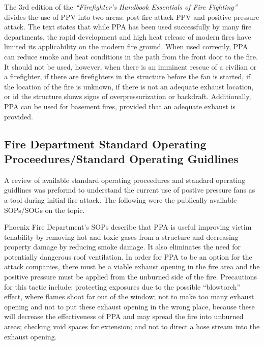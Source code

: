 \documentclass{article}
\begin{document}
The 3rd edition of the \textit{``Firefighter’s Handbook Essentials of Fire Fighting''} divides the use of PPV into two areas: post-fire attack PPV and positive pressure attack. The text states that while PPA has been used successfully by many fire departments, the rapid development and high heat release of modern fires have limited its applicability on the modern fire ground. When used correctly, PPA can reduce smoke and heat conditions in the path from the front door to the fire. It should not be used, however, when there is an imminent rescue of a civilian or a firefighter, if there are firefighters in the structure before the fan is started, if the location of the fire is unknown, if there is not an adequate exhaust location, or id the structure shows signs of overpressurization or backdraft. Additionally, PPA can be used for basement fires, provided that an adequate exhaust is provided.\cite{FFHandbook}

\subsection{Fire Department Standard Operating Proceedures/Standard Operating Guidlines}
A review of available standard operating proceedures and standard operating guidlines was preformd to understand the current use of postive pressure fans as a tool during initial fire attack. The following were the publically available SOPs/SOGs on the topic. 

Phoenix Fire Department’s SOPs describe that PPA is useful improving victim tenability by removing hot and toxic gases from a structure and decreasing property damage by reducing smoke damage. It also eliminates the need for potentially dangerous roof ventilation. In order for PPA to be an option for the attack companies, there must be a viable exhaust opening in the fire area and the positive pressure must be applied from the unburned side of the fire. Precautions for this tactic include: protecting exposures due to the possible “blowtorch” effect, where flames shoot far out of the window; not to make too many exhaust opening and not to put these exhaust opening in the wrong place, because these will decrease the effectiveness of PPA and may spread the fire into unburned areas; checking void spaces for extension; and not to direct a hose stream into the exhaust opening.\cite{PhoenixPPVSOG}
\end{document}
